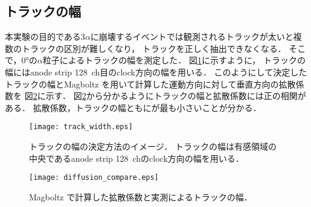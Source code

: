 \documentclass[../master]{subfiles}
\begin{document}
\subsection{トラックの幅}
本実験の目的である3$\alpha$に崩壊するイベントでは観測されるトラックが太いと複数のトラックの区別が難しくなり，
トラックを正しく抽出できなくなる．
そこで，\ang{0}の$\alpha$粒子によるトラックの幅を測定した．
図\ref{fig::track_width}に示すように，
トラックの幅にはanode strip 128~ch目のclock方向の幅を用いる．
このようにして決定したトラックの幅とMagboltz を用いて計算した運動方向に対して垂直方向の拡散係数を%
図\ref{fig::diffusion_compare}に示す．
図\ref{fig::diffusion_compare}から分かるようにトラックの幅と拡散係数には正の相関がある．
拡散係数，トラックの幅ともに\isoButaneHydro が最も小さいことが分かる．
\begin{figure}
  \centering
  \texttt{[image: track\_width.eps]}
  \caption{トラックの幅の決定方法のイメージ．
    トラックの幅は有感領域の中央であるanode strip 128~chのclock方向の幅を用いる．}
  \label{fig::track_width}
\end{figure}

\begin{figure}
  \centering
  \texttt{[image: diffusion\_compare.eps]}
  \caption{Magboltz で計算した拡散係数と実測によるトラックの幅．}
  \label{fig::diffusion_compare}
\end{figure}
\end{document}
